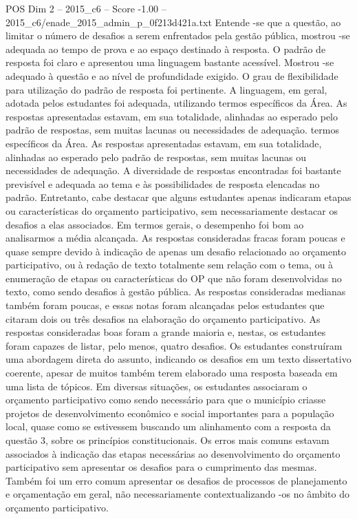 \begin{textsample}{POS Dim 2 – 2015\_c6 – Score -1.00 – 2015\_c6/enade\_2015\_admin\_p\_0f213d421a.txt}
Entende -se que a questão, ao limitar o número de desafios a serem enfrentados pela gestão pública, mostrou -se adequada ao tempo de prova e ao espaço destinado à resposta.
O padrão de resposta foi claro e apresentou uma linguagem bastante acessível.
Mostrou -se adequado à questão e ao nível de profundidade exigido.
O grau de flexibilidade para utilização do padrão de resposta foi pertinente.
A linguagem, em geral, adotada pelos estudantes foi adequada, utilizando termos específicos da Área.
As respostas apresentadas estavam, em sua totalidade, alinhadas ao esperado pelo padrão de respostas, sem muitas lacunas ou necessidades de adequação. termos específicos da Área.
As respostas apresentadas estavam, em sua totalidade, alinhadas ao esperado pelo padrão de respostas, sem muitas lacunas ou necessidades de adequação.
A diversidade de respostas encontradas foi bastante previsível e adequada ao tema e às possibilidades de resposta elencadas no padrão.
Entretanto, cabe destacar que alguns estudantes apenas indicaram etapas ou características do orçamento participativo, sem necessariamente destacar os desafios a elas associados.
Em termos gerais, o desempenho foi bom ao analisarmos a média alcançada.
As respostas consideradas fracas foram poucas e quase sempre devido à indicação de apenas um desafio relacionado ao orçamento participativo, ou à redação de texto totalmente sem relação com o tema, ou à enumeração de etapas ou características do OP que não foram desenvolvidas no texto, como sendo desafios à gestão pública.
As respostas consideradas medianas também foram poucas, e essas notas foram alcançadas pelos estudantes que citaram dois ou três desafios na elaboração do orçamento participativo.
As respostas consideradas boas foram a grande maioria e, nestas, os estudantes foram capazes de listar, pelo menos, quatro desafios.
Os estudantes construíram uma abordagem direta do assunto, indicando os desafios em um texto dissertativo coerente, apesar de muitos também terem elaborado uma resposta baseada em uma lista de tópicos.
Em diversas situações, os estudantes associaram o orçamento participativo como sendo necessário para que o município criasse projetos de desenvolvimento econômico e social importantes para a população local, quase como se estivessem buscando um alinhamento com a resposta da questão 3, sobre os princípios constitucionais.
Os erros mais comuns estavam associados à indicação das etapas necessárias ao desenvolvimento do orçamento participativo sem apresentar os desafios para o cumprimento das mesmas.
Também foi um erro comum apresentar os desafios de processos de planejamento e orçamentação em geral, não necessariamente contextualizando -os no âmbito do orçamento participativo.

\end{textsample}
